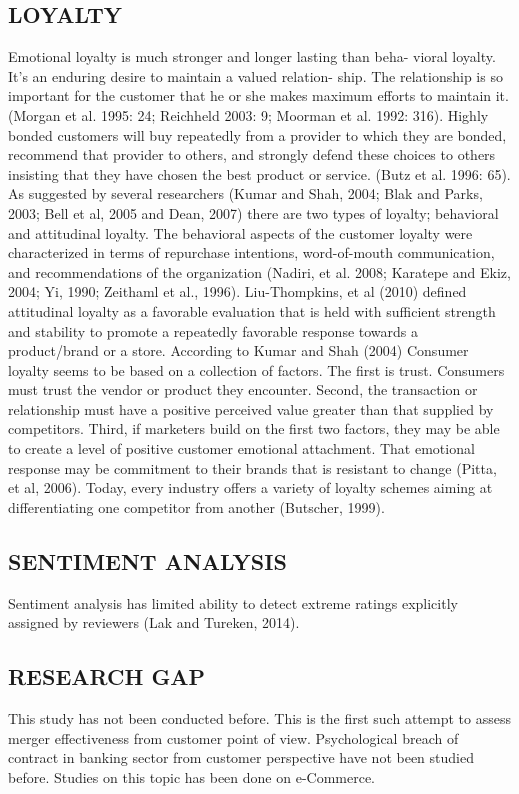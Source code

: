 \documentclass[a4paper, 12pt]{extarticle}
\begin{document}
{\subsection{LOYALTY}
\par Emotional loyalty is much stronger and longer lasting than beha- vioral loyalty. It's an enduring desire to maintain a valued relation- ship. The relationship is so important for the customer that he or she makes maximum efforts to maintain it. (Morgan et al. 1995: 24; Reichheld 2003: 9; Moorman et al. 1992: 316). Highly bonded customers will buy repeatedly from a provider to which they are bonded, recommend that provider to others, and strongly defend these choices to others insisting that they have chosen the best product or service. (Butz et al. 1996: 65). As suggested by several researchers (Kumar and Shah, 2004; Blak and Parks, 2003; Bell et al, 2005 and Dean, 2007) there are two types of loyalty; behavioral and attitudinal loyalty. The behavioral aspects of the customer loyalty were characterized in terms of repurchase intentions, word-of-mouth communication, and recommendations of the organization (Nadiri, et al. 2008; Karatepe and Ekiz, 2004; Yi, 1990; Zeithaml et al., 1996). Liu-Thompkins, et al (2010) defined attitudinal loyalty as a favorable evaluation that is held with sufficient strength and stability to promote a repeatedly favorable response towards a product/brand or a store. According to Kumar and Shah (2004) Consumer loyalty seems to be based on a collection of factors. The first is trust. Consumers must trust the vendor or product they encounter. Second, the transaction or relationship must have a positive perceived value greater than that supplied by competitors. Third, if marketers build on the first two factors, they may be able to create a level of positive customer emotional attachment. That emotional response may be commitment to their brands that is resistant to change (Pitta, et al, 2006). Today, every industry offers a variety of loyalty schemes aiming at differentiating one competitor from another (Butscher, 1999).

\subsection{SENTIMENT ANALYSIS}
Sentiment analysis has limited ability to detect extreme ratings explicitly assigned by reviewers (Lak and Tureken, 2014).



\subsection{RESEARCH GAP}
This study has not been conducted before. This is the first such attempt to assess merger effectiveness from customer point of view. Psychological breach of contract in banking sector from customer perspective have not been studied before. Studies on this topic has been done on e-Commerce.

}
\end{document}
